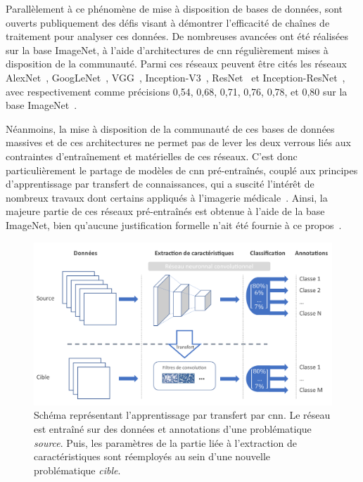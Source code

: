 Parallèlement à ce phénomène de mise à disposition de bases de données, sont ouverts publiquement des défis visant à démontrer l'efficacité de chaînes de traitement pour analyser ces données. De nombreuses avancées ont été réalisées sur la base ImageNet, à l'aide d'architectures de \gls{cnn} régulièrement mises à disposition de la communauté. Parmi ces réseaux peuvent être cités les réseaux AlexNet~\cite{Krizhevsky2012}, GoogLeNet~\cite{Szegedy2015}, VGG~\cite{Simonyan2014}, Inception-V3~\cite{Szegedy2016}, ResNet~\cite{He2016} et Inception-ResNet~\cite{Szegedy2017}, avec respectivement comme précisions 0,54, 0,68, 0,71, 0,76, 0,78, et 0,80 sur la base ImageNet~\cite{Canziani2016}.\par

Néanmoins, la mise à disposition de la communauté de ces bases de données massives et de ces architectures ne permet pas de lever les deux verrous liés aux contraintes d'entraînement et matérielles de ces réseaux. C'est donc particulièrement le partage de modèles de \gls{cnn} pré-entraînés, couplé aux principes d'apprentissage par transfert de connaissances, qui a suscité l'intérêt de nombreux travaux dont certains appliqués à l'imagerie médicale~\cite{Litjens2017}. Ainsi, la majeure partie de ces réseaux pré-entraînés est obtenue à l'aide de la base ImageNet, bien qu'aucune justification formelle n'ait été fournie à ce propos~\cite{Huh2016}.\par
 
\begin{figure}[H]
    \centering
    \includegraphics[width=\linewidth]{contents/chapter_5/resources/scheme_transfer_learning.pdf}
    \caption{Schéma représentant l'apprentissage par transfert par \gls{cnn}. Le réseau est entraîné sur des données et annotations d'une problématique \textit{source}. Puis, les paramètres de la partie liée à l'extraction de caractéristiques sont réemployés au sein d'une nouvelle problématique \textit{cible}.}
    \label{fig:scheme_transfer_learning}
\end{figure}\par

